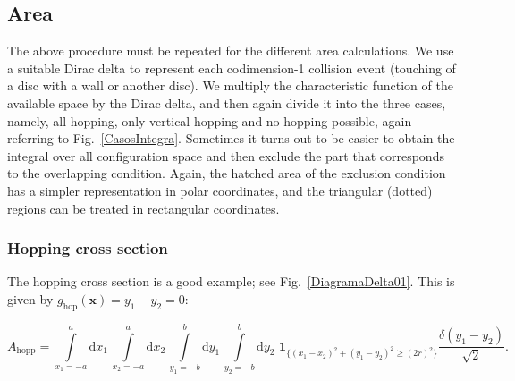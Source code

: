 \documentclass[superscriptaddress,pre,reprint,showpacs,twocolumn]{revtex4-1}
\newcommand{\rd}[1]{\mathrm{d}{#1} \,}
\newcommand{\indicatorsymbol}{\mathbf{1}}
\newcommand{\indicator}[1]{\indicatorsymbol_{ \{   #1 \} } }
\begin{document}
\subsection{Area}

The above procedure must be repeated for the different
area calculations. We use a suitable Dirac delta to represent each codimension-1 collision
event (touching of a disc with a wall or another disc). We multiply the characteristic function of the available space by the Dirac delta, and
then again divide it into the three cases, namely, all hopping, only vertical hopping
and no hopping possible, again referring to Fig.~\ref{CasosIntegra}.
Sometimes it turns out to be easier to obtain 
the integral  over all configuration space and then exclude the part that
corresponds to the overlapping condition. Again, the hatched area of the exclusion
condition has a simpler representation in polar coordinates, and the triangular
(dotted) regions can be treated in rectangular coordinates.
%

\subsubsection{Hopping cross section}

The hopping cross section is a good example; see Fig.~\ref{DiagramaDelta01}. 
This is given by $g_\text{hop}(\mathbf{x}) = y_1 - y_2 = 0$:
\begin{widetext}\label{ahopcart}
\begin{equation}
 A_\text{hopp} = \int \limits_{x_1 = -a}^a \rd {x_1} \int\limits_{x_2 = -a}^a \rd {x_2}
\int\limits_{y_1 = -b}^b \rd {y_1} \int\limits_{y_2 = -b}^b \rd {y_2} \, \indicator{ (x_1-x_2)^2 + (y_1-y_2)^2 \ge (2r)^2 } \frac{\delta(y_1-y_2)}{\sqrt{2}}.
\end{equation}
\end{widetext}
\end{document}
